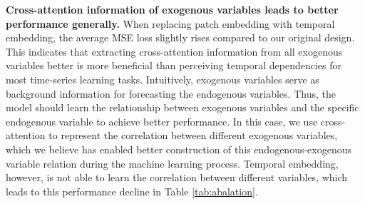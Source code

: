 \documentclass[nohyperref]{article}
\theoremstyle{plain}
\theoremstyle{definition}
\theoremstyle{remark}
\begin{document}
\textbf{Cross-attention information of exogenous variables leads to better performance generally.} When replacing patch embedding with temporal embedding, the average MSE loss slightly rises compared to our original design. This indicates that extracting cross-attention information from all exogenous variables better is more beneficial than perceiving temporal dependencies for most time-series learning tasks. Intuitively, exogenous variables serve as background information for forecasting the endogenous variables. Thus, the model should learn the relationship between exogenous variables and the specific endogenous variable to achieve better performance. In this case, we use cross-attention to represent the correlation between different exogenous variables, which we believe has enabled better construction of this endogenous-exogenous variable relation during the machine learning process. Temporal embedding, however, is not able to learn the correlation between different variables, which leads to this performance decline in Table \ref{tab:abalation}.
\end{document}
